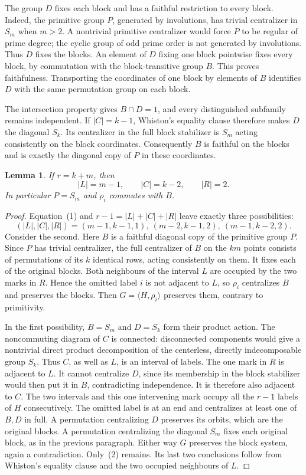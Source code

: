 \documentclass[11pt,a4paper]{article}
\newtheorem{lemma}[theorem]{Lemma}
\newcommand{\gen}[1]{\langle#1\rangle}
\begin{document}
The group $D$ fixes each block and has a faithful restriction to every
block. Indeed, the primitive group $P$, generated by involutions, has
trivial centralizer in $S_m$ when $m>2$. A nontrivial primitive centralizer
would force $P$ to be regular of prime degree; the cyclic group of odd
prime order is not generated by involutions. Thus $D$ fixes the blocks.
An element of $D$ fixing one block pointwise fixes every block, by
commutation with the block-transitive group $B$. This proves faithfulness.
Transporting the coordinates of one block by elements of $B$ identifies
$D$ with the same permutation group on each block.

The intersection property gives $B\cap D=1$, and every distinguished
subfamily remains independent. If $|C|=k-1$, Whiston's equality clause
therefore makes $D$ the diagonal $S_k$. Its centralizer in the full
block stabilizer is $S_m$ acting consistently on the block coordinates.
Consequently $B$ is faithful on the blocks and is exactly the diagonal
copy of $P$ in these coordinates.

\begin{lemma}\label{equality}
If $r=k+m$, then
\[
                  |L|=m-1,\qquad |C|=k-2,\qquad |R|=2.   \tag{2}
\]
In particular $P=S_m$ and $\rho_i$ commutes with $B$.
\end{lemma}
\begin{proof}
Equation~(1) and $r-1=|L|+|C|+|R|$ leave exactly three possibilities:
\[
 (|L|,|C|,|R|)=(m-1,k-1,1),\ (m-2,k-1,2),\ (m-1,k-2,2).
\]
Consider the second. Here $B$ is a faithful diagonal copy of the primitive
group $P$. Since $P$ has trivial centralizer, the full centralizer of $B$
on the $km$ points consists of permutations of its $k$ identical rows,
acting consistently on them. It fixes each of the original blocks.
Both neighbours of the interval $L$ are occupied by the two marks in $R$.
Hence the omitted label $i$ is not adjacent to $L$, so $\rho_i$ centralizes
$B$ and preserves the blocks. Then $G=\gen{H,\rho_i}$ preserves them,
contrary to primitivity.

In the first possibility, $B=S_m$ and $D=S_k$ form their product action.
The noncommuting diagram of $C$ is connected: disconnected components
would give a nontrivial direct product decomposition of the centerless,
directly indecomposable group $S_k$. Thus $C$, as well as $L$, is an
interval of labels. The one mark in $R$ is adjacent to $L$. It cannot
centralize $D$, since its membership in the block stabilizer would then
put it in $B$, contradicting independence. It is therefore also adjacent
to $C$. The two intervals and this one intervening mark occupy all the
$r-1$ labels of $H$ consecutively. The omitted label is at an end and
centralizes at least one of $B,D$ in full. A permutation centralizing
$D$ preserves its orbits, which are the original blocks. A permutation
centralizing the diagonal $S_m$ fixes each original block, as in the
previous paragraph. Either way $G$ preserves the block system, again a
contradiction. Only~(2) remains. Its last two conclusions follow from
Whiston's equality clause and the two occupied neighbours of $L$.
\end{proof}
\end{document}
